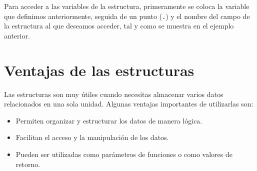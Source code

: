 \documentclass[
  11pt,
  a4paper,
  DIV=11,
  numbers=noendperiod]{scrreprt}
\providecommand{\tightlist}{%
  \setlength{\itemsep}{0pt}\setlength{\parskip}{0pt}}
\begin{document}
Para acceder a las variables de la estructura, primeramente se coloca la
variable que definimos anteriormente, seguida de un punto (\texttt{.}) y
el nombre del campo de la estructura al que deseamos acceder, tal y como
se muestra en el ejemplo anterior.

\section{Ventajas de las estructuras}\label{ventajas-de-las-estructuras}

Las estructuras son muy útiles cuando necesitas almacenar varios datos
relacionados en una sola unidad. Algunas ventajas importantes de
utilizarlas son:

\begin{itemize}
\tightlist
\item
  Permiten organizar y estructurar los datos de manera lógica.
\item
  Facilitan el acceso y la manipulación de los datos.
\item
  Pueden ser utilizadas como parámetros de funciones o como valores de
  retorno.
\end{itemize}
\end{document}
